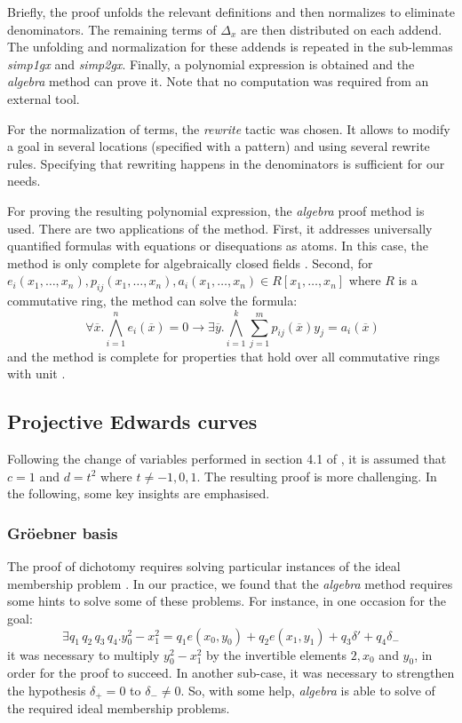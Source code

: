 \documentclass[runningheads]{llncs}
\begin{document}
Briefly, the proof unfolds the relevant definitions and then normalizes to eliminate denominators. The remaining terms of $\Delta_x$ are then distributed on each addend. The unfolding and normalization for these addends is repeated in the sub-lemmas \textit{simp1gx} and \textit{simp2gx}. Finally, a polynomial expression is obtained and the \textit{algebra} method can prove it. Note that no computation was required from an external tool. 

For the normalization of terms, the \textit{rewrite} tactic \cite{noschinskipattern} was chosen. It allows to modify a goal in several locations (specified with a pattern) and using several rewrite rules. Specifying that rewriting happens in the denominators is sufficient for our needs.

For proving the resulting polynomial expression, the \textit{algebra} proof method \cite{chaieb2008automated} is used. There are two applications of the method. First, it addresses universally quantified formulas with equations or disequations as atoms. In this case, the method is only complete for algebraically closed fields \cite{wenzel2019isabelle}. Second, for $e_i(x_1,\ldots,x_n), p_{ij}(x_1,\ldots,x_n),a_i(x_1,\ldots,x_n) \in R[x_1,\ldots,x_n]$ where $R$ is a commutative ring, the method can solve the formula:  \[\; \forall \overline{x}. \bigwedge_{i = 1}^n e_i(\overline{x}) = 0 \to \exists \overline{y}. \bigwedge_{i = 1}^k \sum_{j = 1}^m p_{ij}(\overline{x}) y_j = a_i(\overline{x})\] and the method is complete for properties that hold over all commutative rings with unit \cite{harrison2007automating}. 

\subsection{Projective Edwards curves}

Following the change of variables performed in section 4.1 of \cite{hales2016group}, it is assumed that $c = 1$ and $d = t^2$ where $t \neq -1,0,1$. The resulting proof is more challenging. In the following, some key insights are emphasised. 

\subsubsection{Gr\"{o}ebner basis}

The proof of dichotomy requires solving particular instances of the ideal membership problem \cite{hales2016group}. In our practice, we found that the \textit{algebra} method requires some hints to solve some of these problems. For instance, in one occasion for the goal: \[\exists q_1 \, q_2 \, q_3 \, q_4.
y_0^2 - x_1^2 = 
q_1 e(x_0,y_0) +
q_2 e(x_1,y_1) +
q_3 \delta' +
q_4 \delta_{-} \]  it was necessary to multiply $y_0^2 - x_1^2$ by the invertible elements $2,x_0$ and $y_0$, in order for the proof to succeed. In another sub-case, it was necessary to strengthen the hypothesis $\delta_{+} = 0$ to $\delta_{-} \neq 0$. So, with some help, \textit{algebra} is able to solve of the required ideal membership problems.
\end{document}

